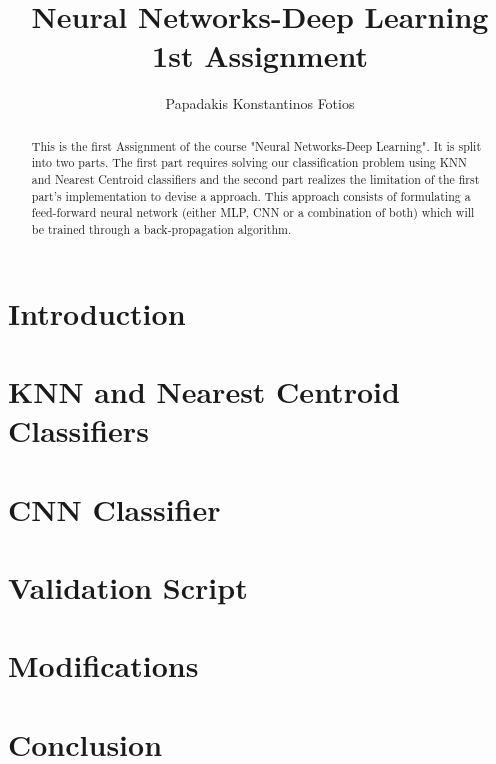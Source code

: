 \documentclass[lettersize,journal]{IEEEtran}
\begin{document}
\title{Neural Networks-Deep Learning \\ 1st Assignment}
\author{Papadakis Konstantinos Fotios}
\maketitle

\begin{abstract}
This is the first Assignment of the course "Neural Networks-Deep Learning". It is split into two parts.
The first part requires solving our classification problem using KNN and Nearest Centroid classifiers and 
the second part realizes the limitation of the first part's implementation to devise a approach. This 
approach consists of formulating a feed-forward neural network (either MLP, CNN or a combination of both)
which will be trained through a back-propagation algorithm.
\end{abstract}

\section{Introduction}
 

\section{KNN and Nearest Centroid Classifiers}


\section{CNN Classifier}


\section{Validation Script}


\section{Modifications}


\section{Conclusion}


\vfill
\end{document}
